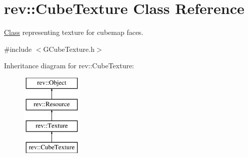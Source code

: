 \hypertarget{classrev_1_1_cube_texture}{}\section{rev\+::Cube\+Texture Class Reference}
\label{classrev_1_1_cube_texture}


\mbox{\hyperlink{struct_class}{Class}} representing texture for cubemap faces.  




{\ttfamily \#include $<$G\+Cube\+Texture.\+h$>$}

Inheritance diagram for rev\+::Cube\+Texture\+:\begin{figure}[H]
\begin{center}
\leavevmode
\includegraphics[height=4.000000cm]{classrev_1_1_cube_texture}
\end{center}
\end{figure}
